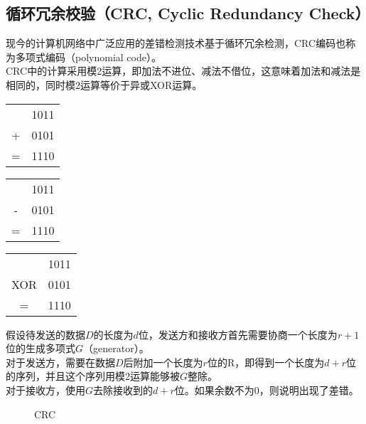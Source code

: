 \vspace{0.5cm}

\subsection{循环冗余校验（CRC, Cyclic Redundancy Check）}

现今的计算机网络中广泛应用的差错检测技术基于循环冗余检测，CRC编码也称为多项式编码（polynomial code）。\\

CRC中的计算采用模2运算，即加法不进位、减法不借位，这意味着加法和减法是相同的，同时模2运算等价于异或XOR运算。\\

\begin{table}[H]
    \centering
    \begin{tabular}{cD{.}{.}{3}}
          & 1011 \\
        + & 0101 \\
        \hline
        = & 1110
    \end{tabular}
    \begin{tabular}{cD{.}{.}{3}}
          & 1011 \\
        - & 0101 \\
        \hline
        = & 1110
    \end{tabular}
    \begin{tabular}{cD{.}{.}{3}}
            & 1011 \\
        XOR & 0101 \\
        \hline
        =   & 1110
    \end{tabular}
\end{table}

假设待发送的数据$ D $的长度为$ d $位，发送方和接收方首先需要协商一个长度为$ r + 1 $位的生成多项式$ G $（generator）。\\

对于发送方，需要在数据$ D $后附加一个长度为$ r $位的R，即得到一个长度为$ d + r $位的序列，并且这个序列用模2运算能够被$ G $整除。\\

对于接收方，使用$ G $去除接收到的$ d + r $位。如果余数不为0，则说明出现了差错。\\

\begin{figure}[H]
    \centering
    \caption{CRC}
\end{figure}

